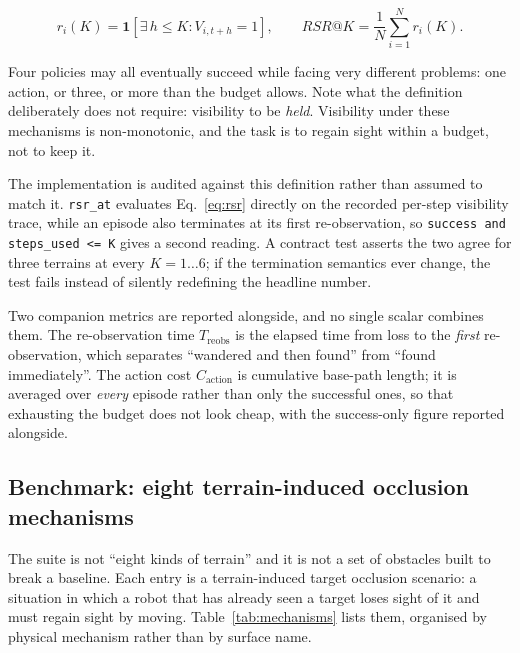 \documentclass[utf8]{FrontiersinHarvard}
\begin{document}
\begin{equation}
r_i(K) = \mathbf{1}\!\left[\exists\, h \le K : V_{i,t+h} = 1\right],
\qquad
RSR@K = \frac{1}{N}\sum_{i=1}^{N} r_i(K).
\label{eq:rsr}
\end{equation}

Four policies may all eventually succeed while facing very different problems: one
action, or three, or more than the budget allows. Note what the definition deliberately
does not require: visibility to be \emph{held}. Visibility under these mechanisms is
non-monotonic, and the task is to regain sight within a budget, not to keep it.

The implementation is audited against this definition rather than assumed to match it.
\texttt{rsr\_at} evaluates Eq.~\ref{eq:rsr} directly on the recorded per-step visibility
trace, while an episode also terminates at its first re-observation, so
\texttt{success and steps\_used <= K} gives a second reading. A contract test asserts
the two agree for three terrains at every $K = 1\ldots 6$; if the termination semantics
ever change, the test fails instead of silently redefining the headline number.

Two companion metrics are reported alongside, and no single scalar combines them. The
re-observation time $T_{\mathrm{reobs}}$ is the elapsed time from loss to the
\emph{first} re-observation, which separates ``wandered and then found'' from ``found
immediately''. The action cost $C_{\mathrm{action}}$ is cumulative base-path length; it
is averaged over \emph{every} episode rather than only the successful ones, so that
exhausting the budget does not look cheap, with the success-only figure reported
alongside.

\subsection{Benchmark: eight terrain-induced occlusion mechanisms}

The suite is not ``eight kinds of terrain'' and it is not a set of obstacles built to
break a baseline. Each entry is a terrain-induced target occlusion scenario: a situation
in which a robot that has already seen a target loses sight of it and must regain sight
by moving. Table~\ref{tab:mechanisms} lists them, organised by physical mechanism
rather than by surface name.
\end{document}
